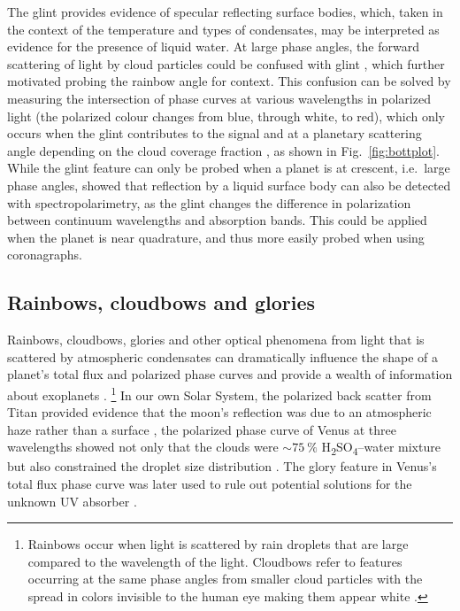 \documentclass[
    usenatbib,
]{mnras}
\begin{document}
The glint provides evidence of specular reflecting surface bodies, which, taken in the context of the temperature and types of condensates, may be interpreted as evidence for the presence of liquid water.
%
At large phase angles, the forward scattering of light by cloud particles could be confused with glint \citep{Robinson_2010}, which further motivated probing the rainbow angle for context.
%
This confusion can be solved by measuring the intersection of phase curves at various wavelengths in polarized light (the polarized colour changes from blue, through white, to red), which only occurs when the glint contributes to the signal and at a planetary scattering angle depending on the cloud coverage fraction \citep{treesandstam2019}, as shown in Fig.~\ref{fig:bottplot}.
%
While the glint feature can only be probed when a planet is at crescent, i.e.\ large phase angles, \citet{trees2022} showed that reflection by a liquid surface body can also be detected with spectropolarimetry, as the glint changes the difference in polarization between continuum wavelengths and absorption bands. This could be applied when the planet is near quadrature, and thus more easily probed when using coronagraphs.


\subsection{Rainbows, cloudbows and glories}

Rainbows, cloudbows, glories and other optical phenomena from light that is 
scattered by atmospheric condensates can dramatically influence the shape of a planet's total flux and polarized phase curves and provide a wealth of information 
about exoplanets \citep{karalidi2012rainbow, stam2008,Bailey2007,2014A&A...566L...1G}.%
\footnote{
    Rainbows occur when light is scattered by rain droplets that are large compared to the wavelength of the light. Cloudbows refer to features occurring at the same phase angles from smaller cloud particles with the spread in colors invisible to the human eye making them appear white \citep[see][for further discussion]{Bailey2007}.  
}
%
In our own Solar System, the polarized back scatter from Titan provided evidence that the moon's reflection was due to an atmospheric haze rather than a surface \citep{zellner1973polarization}, the polarized phase curve of Venus at three wavelengths showed not only that the clouds were $\sim\qty{75}{\percent}$ H\textsubscript{2}SO\textsubscript{4}--water mixture but also constrained the droplet size distribution \citep{hansenhovenier1974}. 
The glory feature in Venus's total flux phase curve was later used to rule out potential solutions for the unknown UV absorber \citep{petrova2018glory}.
\end{document}
